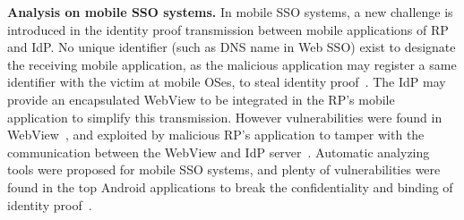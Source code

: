 \begin{comment}
\end{comment}

\noindent\textbf{Analysis on mobile SSO systems.} In mobile SSO systems, a new challenge is introduced in the identity proof transmission between mobile applications of RP and IdP. No unique identifier (such as DNS name in Web SSO) exist to designate the receiving mobile application, as the malicious application may register a same identifier with the victim at mobile OSes, to steal identity proof~\cite{WangZLLYLG15}. The IdP may provide an encapsulated WebView to be integrated in the RP's mobile application to simplify this transmission. However vulnerabilities were found in WebView~\cite{DBLPconfacsacLuoHDWY11}, and exploited by malicious RP's application to tamper with the communication between the WebView and IdP server~\cite{MohsenS16}.
Automatic analyzing tools were proposed for mobile SSO systems, and plenty of vulnerabilities were found in the top Android applications to break the confidentiality and binding of identity proof~\cite{WangZLLYLG15,ShiWL19,MohsenS16,YangLS17}.


